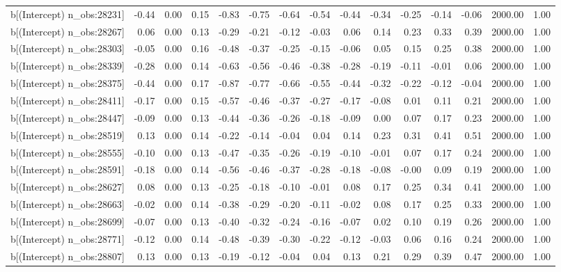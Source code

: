\begin{table}[ht]
\begin{tabular}{rrrrrrrrrrrrrrr}
  b[(Intercept) n\_obs:28231] & -0.44 & 0.00 & 0.15 & -0.83 & -0.75 & -0.64 & -0.54 & -0.44 & -0.34 & -0.25 & -0.14 & -0.06 & 2000.00 & 1.00 \\ 
  b[(Intercept) n\_obs:28267] & 0.06 & 0.00 & 0.13 & -0.29 & -0.21 & -0.12 & -0.03 & 0.06 & 0.14 & 0.23 & 0.33 & 0.39 & 2000.00 & 1.00 \\ 
  b[(Intercept) n\_obs:28303] & -0.05 & 0.00 & 0.16 & -0.48 & -0.37 & -0.25 & -0.15 & -0.06 & 0.05 & 0.15 & 0.25 & 0.38 & 2000.00 & 1.00 \\ 
  b[(Intercept) n\_obs:28339] & -0.28 & 0.00 & 0.14 & -0.63 & -0.56 & -0.46 & -0.38 & -0.28 & -0.19 & -0.11 & -0.01 & 0.06 & 2000.00 & 1.00 \\ 
  b[(Intercept) n\_obs:28375] & -0.44 & 0.00 & 0.17 & -0.87 & -0.77 & -0.66 & -0.55 & -0.44 & -0.32 & -0.22 & -0.12 & -0.04 & 2000.00 & 1.00 \\ 
  b[(Intercept) n\_obs:28411] & -0.17 & 0.00 & 0.15 & -0.57 & -0.46 & -0.37 & -0.27 & -0.17 & -0.08 & 0.01 & 0.11 & 0.21 & 2000.00 & 1.00 \\ 
  b[(Intercept) n\_obs:28447] & -0.09 & 0.00 & 0.13 & -0.44 & -0.36 & -0.26 & -0.18 & -0.09 & 0.00 & 0.07 & 0.17 & 0.23 & 2000.00 & 1.00 \\ 
  b[(Intercept) n\_obs:28519] & 0.13 & 0.00 & 0.14 & -0.22 & -0.14 & -0.04 & 0.04 & 0.14 & 0.23 & 0.31 & 0.41 & 0.51 & 2000.00 & 1.00 \\ 
  b[(Intercept) n\_obs:28555] & -0.10 & 0.00 & 0.13 & -0.47 & -0.35 & -0.26 & -0.19 & -0.10 & -0.01 & 0.07 & 0.17 & 0.24 & 2000.00 & 1.00 \\ 
  b[(Intercept) n\_obs:28591] & -0.18 & 0.00 & 0.14 & -0.56 & -0.46 & -0.37 & -0.28 & -0.18 & -0.08 & -0.00 & 0.09 & 0.19 & 2000.00 & 1.00 \\ 
  b[(Intercept) n\_obs:28627] & 0.08 & 0.00 & 0.13 & -0.25 & -0.18 & -0.10 & -0.01 & 0.08 & 0.17 & 0.25 & 0.34 & 0.41 & 2000.00 & 1.00 \\ 
  b[(Intercept) n\_obs:28663] & -0.02 & 0.00 & 0.14 & -0.38 & -0.29 & -0.20 & -0.11 & -0.02 & 0.08 & 0.17 & 0.25 & 0.33 & 2000.00 & 1.00 \\ 
  b[(Intercept) n\_obs:28699] & -0.07 & 0.00 & 0.13 & -0.40 & -0.32 & -0.24 & -0.16 & -0.07 & 0.02 & 0.10 & 0.19 & 0.26 & 2000.00 & 1.00 \\ 
  b[(Intercept) n\_obs:28771] & -0.12 & 0.00 & 0.14 & -0.48 & -0.39 & -0.30 & -0.22 & -0.12 & -0.03 & 0.06 & 0.16 & 0.24 & 2000.00 & 1.00 \\ 
  b[(Intercept) n\_obs:28807] & 0.13 & 0.00 & 0.13 & -0.19 & -0.12 & -0.04 & 0.04 & 0.13 & 0.21 & 0.29 & 0.39 & 0.47 & 2000.00 & 1.00 \\ 

\end{tabular}
\end{table}
